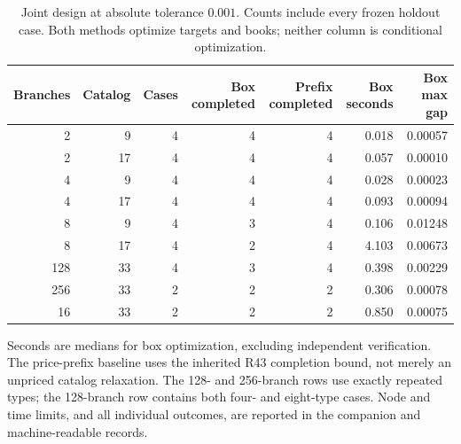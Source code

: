 \begin{table}[p]\centering
\caption{Joint design at absolute tolerance $0.001$. Counts include every frozen holdout case. Both methods optimize targets and books; neither column is conditional optimization.}\label{tab:r46-joint}
\begin{tabular}{rrrrrrr}\toprule
Branches & Catalog & Cases & Box completed & Prefix completed & Box seconds & Box max gap \\\midrule
2 & 9 & 4 & 4 & 4 & 0.018 & 0.00057 \\
2 & 17 & 4 & 4 & 4 & 0.057 & 0.00010 \\
4 & 9 & 4 & 4 & 4 & 0.028 & 0.00023 \\
4 & 17 & 4 & 4 & 4 & 0.093 & 0.00094 \\
8 & 9 & 4 & 3 & 4 & 0.106 & 0.01248 \\
8 & 17 & 4 & 2 & 4 & 4.103 & 0.00673 \\
128 & 33 & 4 & 3 & 4 & 0.398 & 0.00229 \\
256 & 33 & 2 & 2 & 2 & 0.306 & 0.00078 \\
16 & 33 & 2 & 2 & 2 & 0.850 & 0.00075 \\
\bottomrule\end{tabular}
\par\smallskip\raggedright Seconds are medians for box optimization, excluding independent verification. The price-prefix baseline uses the inherited R43 completion bound, not merely an unpriced catalog relaxation. The 128- and 256-branch rows use exactly repeated types; the 128-branch row contains both four- and eight-type cases. Node and time limits, and all individual outcomes, are reported in the companion and machine-readable records.
\end{table}
